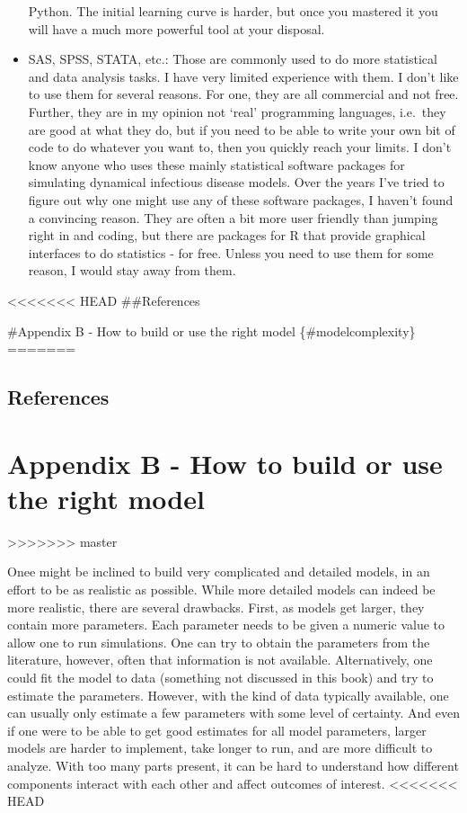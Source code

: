 \documentclass[]{book}
\theoremstyle{definition}
\theoremstyle{definition}
\theoremstyle{definition}
\theoremstyle{remark}
\begin{document}
\begin{itemize}
  Python. The initial learning curve is harder, but once you mastered it
  you will have a much more powerful tool at your disposal.
\item
  SAS, SPSS, STATA, etc.: Those are commonly used to do more statistical
  and data analysis tasks. I have very limited experience with them. I
  don't like to use them for several reasons. For one, they are all
  commercial and not free. Further, they are in my opinion not `real'
  programming languages, i.e.~they are good at what they do, but if you
  need to be able to write your own bit of code to do whatever you want
  to, then you quickly reach your limits. I don't know anyone who uses
  these mainly statistical software packages for simulating dynamical
  infectious disease models. Over the years I've tried to figure out why
  one might use any of these software packages, I haven't found a
  convincing reason. They are often a bit more user friendly than
  jumping right in and coding, but there are packages for R that provide
  graphical interfaces to do statistics - for free. Unless you need to
  use them for some reason, I would stay away from them.
\end{itemize}

<<<<<<< HEAD
\#\#References

\#Appendix B - How to build or use the right model \{\#modelcomplexity\}
=======
\section{References}\label{references-19}

\chapter{Appendix B - How to build or use the right
model}\label{modelcomplexity}
>>>>>>> master

Onee might be inclined to build very complicated and detailed models, in
an effort to be as realistic as possible. While more detailed models can
indeed be more realistic, there are several drawbacks. First, as models
get larger, they contain more parameters. Each parameter needs to be
given a numeric value to allow one to run simulations. One can try to
obtain the parameters from the literature, however, often that
information is not available. Alternatively, one could fit the model to
data (something not discussed in this book) and try to estimate the
parameters. However, with the kind of data typically available, one can
usually only estimate a few parameters with some level of certainty. And
even if one were to be able to get good estimates for all model
parameters, larger models are harder to implement, take longer to run,
and are more difficult to analyze. With too many parts present, it can
be hard to understand how different components interact with each other
and affect outcomes of interest.
<<<<<<< HEAD
\end{document}
